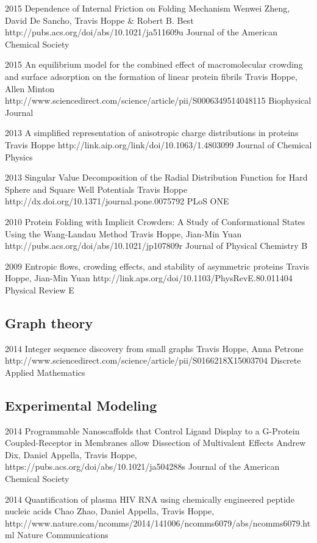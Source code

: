 \documentclass[]{scrartcl}
\begin{document}
\begin{cleanCV}
\Paper
{2015}
{Dependence of Internal Friction on Folding Mechanism}
{Wenwei Zheng, David De Sancho, Travis Hoppe \& Robert B. Best}
{http://pubs.acs.org/doi/abs/10.1021/ja511609u}
{Journal of the American Chemical Society}

\Paper
{2015}
{An equilibrium model for the combined effect of macromolecular crowding and surface adsorption on the formation of linear protein fibrils}
{Travis Hoppe, Allen Minton}
{http://www.sciencedirect.com/science/article/pii/S0006349514048115}
{Biophysical Journal}

\Paper
{2013}
{A simplified representation of anisotropic charge distributions in proteins}
{Travis Hoppe}
{http://link.aip.org/link/doi/10.1063/1.4803099}
{Journal of Chemical Physics}

\Paper
{2013}
{Singular Value Decomposition of the Radial Distribution Function 
for Hard Sphere and Square Well Potentials}
{Travis Hoppe}
{http://dx.doi.org/10.1371/journal.pone.0075792}
{PLoS ONE}

\Paper
{2010}
{Protein Folding with Implicit Crowders: 
  A Study of Conformational States Using the Wang-Landau Method}
{Travis Hoppe, Jian-Min Yuan}
{http://pubs.acs.org/doi/abs/10.1021/jp107809r}
{Journal of Physical Chemistry B}


\Paper
{2009}
{Entropic flows, crowding effects, and stability of asymmetric proteins}
{Travis Hoppe, Jian-Min Yuan}
{http://link.aps.org/doi/10.1103/PhysRevE.80.011404}
{Physical Review E}


\subsection{Graph theory}

\Paper
{2014}
{Integer sequence discovery from small graphs}
{Travis Hoppe, Anna Petrone}
{http://www.sciencedirect.com/science/article/pii/S0166218X15003704}
{Discrete Applied Mathematics}

\subsection{Experimental Modeling}

\Paper
{2014}
{Programmable Nanoscaffolds that Control Ligand Display to a G-Protein Coupled-Receptor in Membranes allow Dissection of Multivalent Effects}
{Andrew Dix, Daniel Appella, Travis Hoppe, \etal}
{https://pubs.acs.org/doi/abs/10.1021/ja504288s}
{Journal of the American Chemical Society}

\Paper
{2014}
{Quantification of plasma HIV RNA using chemically engineered peptide nucleic acids}
{Chao Zhao, Daniel Appella, Travis Hoppe, \etal}
{http://www.nature.com/ncomms/2014/141006/ncomms6079/abs/ncomms6079.html}
{Nature Communications}


\end{cleanCV}
\end{document}
